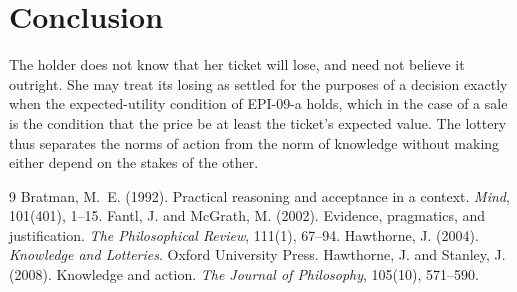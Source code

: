 \documentclass{situationist-preprint}
\begin{document}
\section{Conclusion}

The holder does not know that her ticket will lose, and need not believe it outright. She may treat its losing as settled for the purposes of a decision exactly when the expected-utility condition of EPI-09-a holds, which in the case of a sale is the condition that the price be at least the ticket's expected value. The lottery thus separates the norms of action from the norm of knowledge without making either depend on the stakes of the other.

\begin{thebibliography}{9}\small
{} Bratman, M.~E. (1992). Practical reasoning and acceptance in a context. \emph{Mind}, 101(401), 1--15.
 Fantl, J. and McGrath, M. (2002). Evidence, pragmatics, and justification. \emph{The Philosophical Review}, 111(1), 67--94.
 Hawthorne, J. (2004). \emph{Knowledge and Lotteries}. Oxford University Press.
 Hawthorne, J. and Stanley, J. (2008). Knowledge and action. \emph{The Journal of Philosophy}, 105(10), 571--590.
\end{thebibliography}
\end{document}

